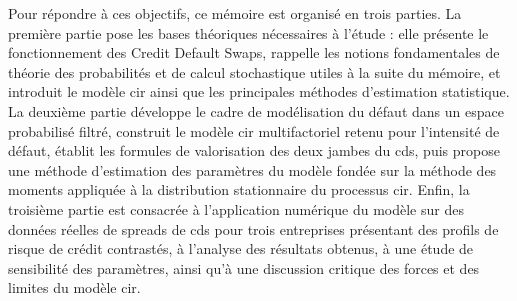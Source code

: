 Pour répondre à ces objectifs, ce mémoire est organisé en trois parties.
La première partie pose les bases théoriques nécessaires à l'étude :
elle présente le fonctionnement des Credit Default Swaps, rappelle les
notions fondamentales de théorie des probabilités et de calcul stochastique
utiles à la suite du mémoire, et introduit le modèle \gls{cir} ainsi que les
principales méthodes d'estimation statistique. La deuxième partie
développe le cadre de modélisation du défaut dans un espace probabilisé
filtré, construit le modèle \gls{cir} multifactoriel retenu pour l'intensité de
défaut, établit les formules de valorisation des deux jambes du \gls{cds}, puis
propose une méthode d'estimation des paramètres du modèle fondée sur la
méthode des moments appliquée à la distribution stationnaire du processus
\gls{cir}. Enfin, la troisième partie est consacrée à l'application numérique du
modèle sur des données réelles de spreads de \gls{cds} pour trois entreprises
présentant des profils de risque de crédit contrastés, à l'analyse des
résultats obtenus, à une étude de sensibilité des paramètres, ainsi
qu'à une discussion critique des forces et des limites du modèle \gls{cir}.